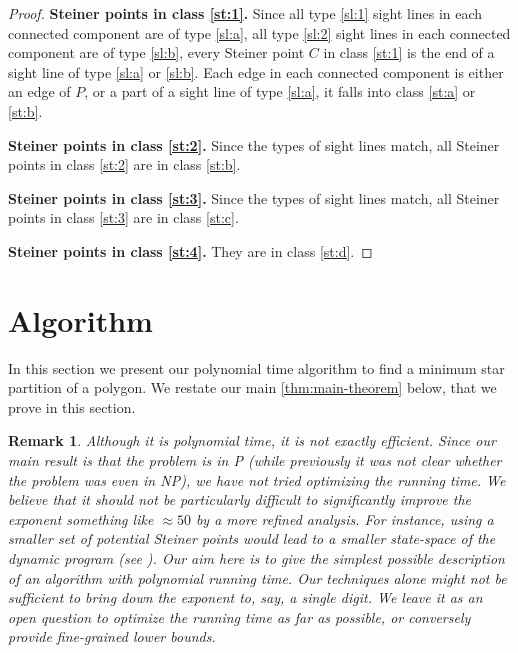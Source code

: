 \documentclass[10pt,a4paper]{article}
\newtheorem{remark}{Remark}[section]
\begin{document}
\begin{proof}
    \textbf{\boldmath Steiner points in class \ref{st:1}. }
    Since all type \ref{sl:1} sight lines in each connected component are of type \ref{sl:a}, all type \ref{sl:2} sight lines in each connected component are of type \ref{sl:b}, every Steiner point $C$ in class \ref{st:1} is the end of a sight line of type \ref{sl:a} or \ref{sl:b}. 
    Each edge in each connected component is either an edge of $P$, or a part of a sight line of type \ref{sl:a}, it falls into class \ref{st:a} or \ref{st:b}. 

    \textbf{\boldmath Steiner points in class \ref{st:2}. }
    Since the types of sight lines match, all Steiner points in class \ref{st:2} are in class \ref{st:b}. 

    \textbf{\boldmath Steiner points in class \ref{st:3}. }
    Since the types of sight lines match, all Steiner points in class \ref{st:3} are in class \ref{st:c}. 

    \textbf{\boldmath Steiner points in class \ref{st:4}. }
    They are in class \ref{st:d}. 
\end{proof}

\section{Algorithm} 
\label{sec:algorithm}
In this section we present our polynomial time algorithm to find a minimum star partition of a polygon. We restate our main \cref{thm:main-theorem} below, that we prove in this section.

\MainTheorem*

\begin{remark}
\label{rem:alg-running-time}
Although it is polynomial time, it is not exactly efficient. Since our main result is that the problem is in \textsf{P} (while previously it was not clear whether the problem was even in \textsf{NP}), we have not tried optimizing the running time.
We believe that it should not be particularly difficult to significantly improve the exponent something like $\approx 50$ by a more refined analysis.
For instance, using a smaller set of potential Steiner points would lead to a smaller state-space of the dynamic program (see ).
Our aim here is to give the simplest possible description of an algorithm with polynomial running time.
Our techniques alone might not be sufficient to bring down the exponent to, say, a single digit.
We leave it as an open question to optimize the running time as far as possible, or conversely provide fine-grained lower bounds.
\end{remark}
\end{document}
